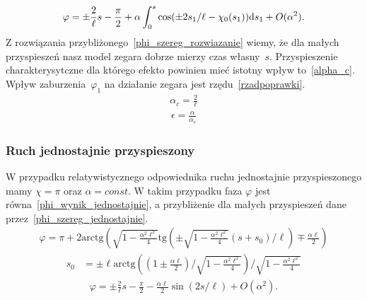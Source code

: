 \begin{align}\label{phi_szereg_rozwiazanie}
\varphi =  \pm \frac{2}{\ell}s - \frac{\pi}{2} 
+\alpha  \int_0^s \cos (\pm 2 s_1 / \ell  - \chi_0(s_1)  ) \text{d} s_1 
+O(\alpha^2).
\end{align}
Z rozwiązania przybliżonego~\eqref{phi_szereg_rozwiazanie} 
wiemy, że dla małych przyspieszeń nasz model zegara dobrze 
mierzy czas własny~$s$. Przyspieszenie charakterysytczne dla 
którego efekto powinien mieć istotny wpływ to~\eqref{alpha_c}.
Wpływ zaburzenia~$\varphi_1$ na działanie zegara jest 
rzędu~\eqref{rzadpoprawki}.
\begin{align}\label{alpha_c}
\alpha_c = \frac{2}{\ell}
\end{align}
\begin{align}\label{rzadpoprawki}
\epsilon = \frac{\alpha}{\alpha_c}
\end{align}

\subsubsection{Ruch jednostajnie przyspieszony}
W przypadku relatywistycznego odpowiednika ruchu jednostajnie 
przyspieszonego mamy $\chi = \pi$ oraz $\alpha = const$.
W takim przypadku faza $\varphi$ jest 
równa~\eqref{phi_wynik_jednostajnie}, a 
przybliżenie dla małych przyspieszeń dane 
przez~\eqref{phi_szereg_jednostajnie}.
\begin{align}\label{phi_wynik_jednostajnie}
\varphi = \pi + 
2\text{arctg} \left( 
\sqrt{1-\frac{\alpha^2\ell^2}{4}} 
\text{tg} \left( \pm 
\sqrt{1-\frac{\alpha^2\ell^2}{4}} 
(s + s_0)/\ell\right)  \mp \frac{\alpha \ell}{2}
\right)
\end{align}
\begin{align*}
s_0 & = \pm \ell \text{arctg}  
\left( \left(1 \pm\frac{\alpha\ell}{2}\right) \Big / 
\sqrt{1-\frac{\alpha^2\ell^2}{4}}  \right)
\Big /\sqrt{1-\frac{\alpha^2\ell^2}{4}}
\end{align*}
\begin{align}\label{phi_szereg_jednostajnie}
\varphi =  \pm \frac{2}{\ell}s - \frac{\pi}{2} 
- \frac{\alpha \ell}{2}  \sin (2 s / \ell  )  
+O(\alpha^2).
\end{align}
